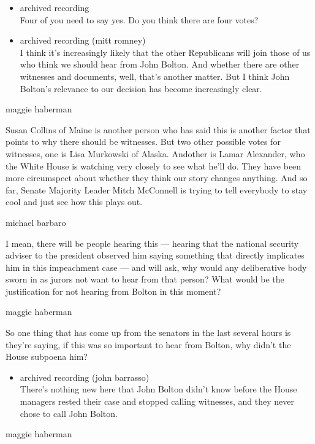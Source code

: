 \begin{itemize}
\item
  archived recording\\
  Four of you need to say yes. Do you think there are four votes?
\item
  archived recording (mitt romney)\\
  I think it's increasingly likely that the other Republicans will join
  those of us who think we should hear from John Bolton. And whether
  there are other witnesses and documents, well, that's another matter.
  But I think John Bolton's relevance to our decision has become
  increasingly clear.
\end{itemize}

maggie haberman

Susan Collins of Maine is another person who has said this is another
factor that points to why there should be witnesses. But two other
possible votes for witnesses, one is Lisa Murkowski of Alaska. Andother
is Lamar Alexander, who the White House is watching very closely to see
what he'll do. They have been more circumspect about whether they think
our story changes anything. And so far, Senate Majority Leader Mitch
McConnell is trying to tell everybody to stay cool and just see how this
plays out.

michael barbaro

I mean, there will be people hearing this --- hearing that the national
security adviser to the president observed him saying something that
directly implicates him in this impeachment case --- and will ask, why
would any deliberative body sworn in as jurors not want to hear from
that person? What would be the justification for not hearing from Bolton
in this moment?

maggie haberman

So one thing that has come up from the senators in the last several
hours is they're saying, if this was so important to hear from Bolton,
why didn't the House subpoena him?

\begin{itemize}
\tightlist
\item
  archived recording (john barrasso)\\
  There's nothing new here that John Bolton didn't know before the House
  managers rested their case and stopped calling witnesses, and they
  never chose to call John Bolton.
\end{itemize}

maggie haberman

